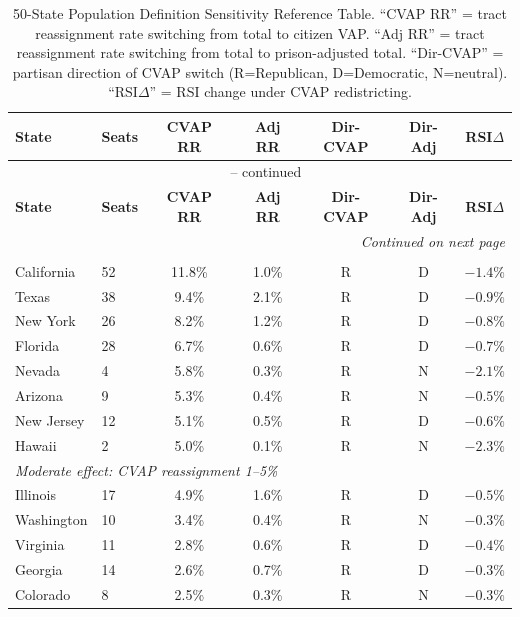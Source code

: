 \begin{longtable}{llccccc}
\caption{50-State Population Definition Sensitivity Reference Table. ``CVAP RR'' = tract reassignment rate switching from total to citizen VAP. ``Adj RR'' = tract reassignment rate switching from total to prison-adjusted total. ``Dir-CVAP'' = partisan direction of CVAP switch (R=Republican, D=Democratic, N=neutral). ``RSI$\Delta$'' = RSI change under CVAP redistricting.} \label{tab:fifty_state} \\
\toprule
\textbf{State} & \textbf{Seats} & \textbf{CVAP RR} & \textbf{Adj RR} & \textbf{Dir-CVAP} & \textbf{Dir-Adj} & \textbf{RSI$\Delta$} \\
\midrule
\endfirsthead
\multicolumn{7}{c}{\tablename\ \thetable{} -- continued} \\
\toprule
\textbf{State} & \textbf{Seats} & \textbf{CVAP RR} & \textbf{Adj RR} & \textbf{Dir-CVAP} & \textbf{Dir-Adj} & \textbf{RSI$\Delta$} \\
\midrule
\endhead
\midrule
\multicolumn{7}{r}{\textit{Continued on next page}} \\
\endfoot
\bottomrule
\endlastfoot
%
\multicolumn{7}{l}{\textit{High effect: CVAP reassignment $\geq$ 5\%}} \\
California & 52 & 11.8\% & 1.0\% & R & D & $-1.4\%$ \\
Texas & 38 & 9.4\% & 2.1\% & R & D & $-0.9\%$ \\
New York & 26 & 8.2\% & 1.2\% & R & D & $-0.8\%$ \\
Florida & 28 & 6.7\% & 0.6\% & R & D & $-0.7\%$ \\
Nevada & 4 & 5.8\% & 0.3\% & R & N & $-2.1\%$ \\
Arizona & 9 & 5.3\% & 0.4\% & R & N & $-0.5\%$ \\
New Jersey & 12 & 5.1\% & 0.5\% & R & D & $-0.6\%$ \\
Hawaii & 2 & 5.0\% & 0.1\% & R & N & $-2.3\%$ \\
%
\multicolumn{7}{l}{\textit{Moderate effect: CVAP reassignment 1--5\%}} \\
Illinois & 17 & 4.9\% & 1.6\% & R & D & $-0.5\%$ \\
Washington & 10 & 3.4\% & 0.4\% & R & N & $-0.3\%$ \\
Virginia & 11 & 2.8\% & 0.6\% & R & D & $-0.4\%$ \\
Georgia & 14 & 2.6\% & 0.7\% & R & D & $-0.3\%$ \\
Colorado & 8 & 2.5\% & 0.3\% & R & N & $-0.3\%$ \\

\end{longtable}
